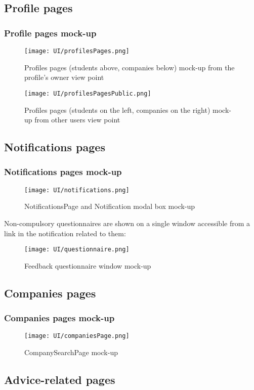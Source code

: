 	\subsection{Profile pages}
	\subsubsection{Profile pages mock-up}
	\begin{figure}[H]
		\centering
		\caption{Profiles pages (students above, companies below) mock-up from the profile's owner view point}
		\texttt{[image: UI/profilesPages.png]}
	\end{figure}
	\begin{figure}[H]
		\centering
		\caption{Profiles pages (students on the left, companies on the right) mock-up from other users view point}
		\texttt{[image: UI/profilesPagesPublic.png]}
	\end{figure}
	\subsection{Notifications pages}
	\subsubsection{Notifications pages mock-up}
	\begin{figure}[H]
		\centering
		\caption{NotificationsPage and Notification modal box mock-up}
		\texttt{[image: UI/notifications.png]}
	\end{figure}
	Non-compulsory questionnaires are shown on a single window accessible from a link in the notification related to them:
	\begin{figure}[H]
		\centering
		\caption{Feedback questionnaire window mock-up}
		\texttt{[image: UI/questionnaire.png]}
	\end{figure}
	\subsection{Companies pages}
	\subsubsection{Companies pages mock-up}
	\begin{figure}[H]
		\centering
		\caption{CompanySearchPage mock-up}
		\texttt{[image: UI/companiesPage.png]}
	\end{figure}
	\subsection{Advice-related pages}
